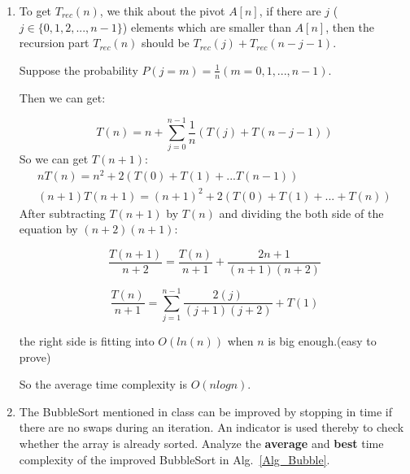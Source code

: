 \documentclass[12pt,a4paper]{article}
\makeatletter
\newtheorem*{solution}{Solution}
\theoremstyle{definition}
\renewenvironment{solution}[1][Solution] {\par\pushQED{\qed}\normalfont\topsep6\p@\@plus6\p@\relax\trivlist\item[\hskip\labelsep\bfseries#1\@addpunct{.}]\ignorespaces}{\popQED\endtrivlist\@endpefalse} \makeatother
\makeatother
\begin{document}
\begin{enumerate}
\begin{solution}
           To get $T_{rec}(n)$, we thik about the pivot $A[n]$, if there are $j$ ($j \in \{0, 1, 2, ..., n - 1\}$) elements which are 
           smaller than $A[n]$, then the recursion part $T_{rec}(n)$ should be $T_{rec}(j) + T_{rec}(n - j - 1)$.

           Suppose the probability $P(j = m) = \frac{1}{n} (m = 0, 1, ..., n - 1)$.

           Then we can get:

           \begin{equation*}
               T(n) = n  + \sum_{j = 0}^{n - 1}{\frac{1}{n}(T(j) + T(n - j - 1))} 
           \end{equation*}
So we can get $T(n + 1)$:
           \begin{align*}
              nT(n) = n^2 + 2(T(0) + T(1) + ... T(n - 1)) \\
                 (n + 1)T(n + 1) = (n + 1)^2 + 2(T(0) + T(1) + ... + T(n))
            \end{align*}
 After subtracting $T(n + 1)$ by $T(n)$ and dividing the both side of the equation by $(n + 2)(n + 1)$:
       
 \begin{equation*}
         \frac{T(n + 1)}{n + 2} = \frac{T(n)}{n + 1} + \frac{2n + 1}{(n + 1)(n +2)}
\end{equation*}
         
   \begin{equation*}
      \frac{T(n)}{n + 1} = \sum_{j = 1}^{n - 1}{\frac{2(j)}{(j + 1)(j + 2)}} + T(1) 
   \end{equation*}
   
   the right side is fitting into $O(ln(n))$ when $n$ is big enough.(easy to prove)
   
   So the average time complexity is $O(nlogn)$.

    \end{solution}

    \item
    The BubbleSort mentioned in class can be improved by stopping in time if there are no swaps during an iteration. An indicator is used thereby to check whether the array is already sorted. Analyze the \textbf{average} and \textbf{best} time complexity of the improved BubbleSort in Alg.~\ref{Alg_Bubble}.

    \begin{minipage}[t]{0.8\textwidth}
    \begin{algorithm}[H]


\end{algorithm}
\end{minipage}
\end{enumerate}
\end{document}
